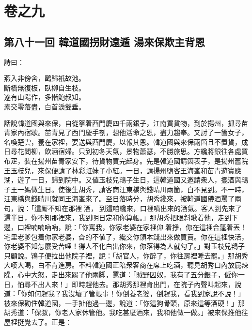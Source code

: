 \part*{{\titlename}卷之九}



\chapter*{第八十一回 韓道國拐財遠遁 湯來保欺主背恩}


詩曰：

\begin{myquote}
燕入非傍舍，鷗歸衹故池。\\斷橋無復板，臥柳自生枝。\\遂有山陽作，多慚鮑叔知。\\素交零落盡，白首淚雙垂。
\end{myquote}

話說韓道國與來保，自從拏着西門慶四千兩銀子，江南買貨物，到於揚州，抓尋苗青家內宿歇。苗青見了西門慶手劄，想他活命之恩，盡力趨奉。又討了一箇女子，名喚楚雲，養在家裡，要送與西門慶，以報其恩。韓道國與來保兩箇且不置貨，成日尋花問柳，飲酒宿婦。{}只到初冬天氣，景物蕭瑟，不勝旅思。方纔將銀往各處買布疋，裝在揚州苗青家安下，待貨物買完起身。先是韓道國請箇表子，是揚州舊院王玉枝兒，來保便請了林彩虹妹子小紅。一日，請揚州鹽客王海峯和苗青遊寶應湖，遊了一日，歸到院中。又値玉枝兒鴇子生日，{}這韓道國又邀請衆人，擺酒與鴇子王一媽做生日。使後生胡秀，請客商汪東橋與錢晴川兩箇，白不見到。不一時，汪東橋與錢晴川就同王海峯來了。至日落時分，胡秀纔來，被韓道國帶酒罵了兩句，說：「這厮不知在那裡𠳹酒，𠳹到這咱纔來，口裡噴出來的酒氣。客人到先來了這半日，你不知那裡來，我到明日定和你算帳。」那胡秀把眼斜瞅着他，走到下邊，口裡喃喃吶吶，說：「你罵我，你家老婆在家裡仰𢵞着掙，你在這裡合蓬着丟！宅里老爹包着你家老婆，㒲的不値了，纔交你領本錢出來做買賣。你在這裡快活，你老婆不知怎麼受苦哩！得人不化白出你來，你落得為人就勾了。」{}對玉枝兒鴇子只顧說。鴇子便拉出他院子裡，說：「胡官人，你醉了，你往房裡睡去罷。」那胡秀大喓大喝，白不肯進房。不料韓道國正陪衆客商在席上吃酒，聽見胡秀口內放屁辣臊，心中大怒，走出來踢了他兩脚，罵道：「賊野囚奴，我有了五分銀子，僱你一日，怕尋不出人來！」{}即時趕他去。那胡秀那裡肯出門，在院子內聲叫起來，說道：「你如何趕我？我沒壞了管帳事！你倒養老婆，倒趕我，看我到家說不說！」{}被來保勸住韓道國，一手扯他過一邊，說道：「你這狗骨頭，原來這等酒硬！」那胡秀道：「保叔，你老人家休管他。我吃甚麼酒來，我和他做一做。」被來保推他往屋裡挺覺去了。正是：

